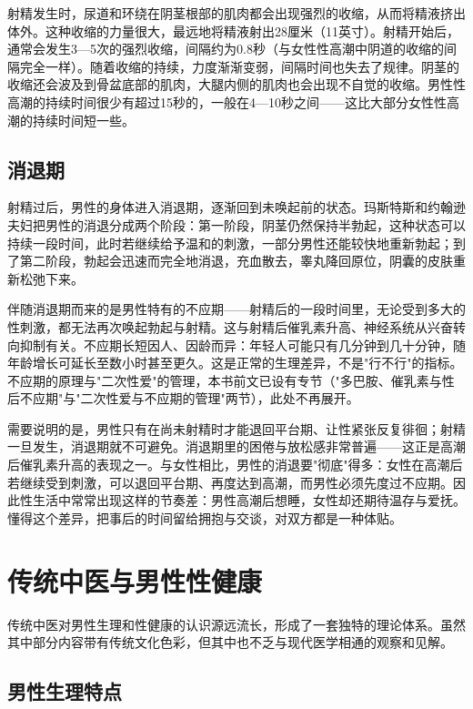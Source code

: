 射精发生时，尿道和环绕在阴茎根部的肌肉都会出现强烈的收缩，从而将精液挤出体外。这种收缩的力量很大，最远地将精液射出28厘米（11英寸）。射精开始后，通常会发生3—5次的强烈收缩，间隔约为0.8秒（与女性性高潮中阴道的收缩的间隔完全一样）。随着收缩的持续，力度渐渐变弱，间隔时间也失去了规律。阴茎的收缩还会波及到骨盆底部的肌肉，大腿内侧的肌肉也会出现不自觉的收缩。男性性高潮的持续时间很少有超过15秒的，一般在4—10秒之间——这比大部分女性性高潮的持续时间短一些。

\subsection{消退期}

射精过后，男性的身体进入消退期，逐渐回到未唤起前的状态。玛斯特斯和约翰逊夫妇把男性的消退分成两个阶段：第一阶段，阴茎仍然保持半勃起，这种状态可以持续一段时间，此时若继续给予温和的刺激，一部分男性还能较快地重新勃起；到了第二阶段，勃起会迅速而完全地消退，充血散去，睾丸降回原位，阴囊的皮肤重新松弛下来。

伴随消退期而来的是男性特有的不应期——射精后的一段时间里，无论受到多大的性刺激，都无法再次唤起勃起与射精。这与射精后催乳素升高、神经系统从兴奋转向抑制有关。不应期长短因人、因龄而异：年轻人可能只有几分钟到几十分钟，随年龄增长可延长至数小时甚至更久。这是正常的生理差异，不是"行不行"的指标。不应期的原理与"二次性爱"的管理，本书前文已设有专节（"多巴胺、催乳素与性后不应期"与"二次性爱与不应期的管理"两节），此处不再展开。

需要说明的是，男性只有在尚未射精时才能退回平台期、让性紧张反复徘徊；射精一旦发生，消退期就不可避免。消退期里的困倦与放松感非常普遍——这正是高潮后催乳素升高的表现之一。与女性相比，男性的消退要"彻底"得多：女性在高潮后若继续受到刺激，可以退回平台期、再度达到高潮，而男性必须先度过不应期。因此性生活中常常出现这样的节奏差：男性高潮后想睡，女性却还期待温存与爱抚。懂得这个差异，把事后的时间留给拥抱与交谈，对双方都是一种体贴。

\section{传统中医与男性性健康}

传统中医对男性生理和性健康的认识源远流长，形成了一套独特的理论体系。虽然其中部分内容带有传统文化色彩，但其中也不乏与现代医学相通的观察和见解。

\subsection{男性生理特点}


